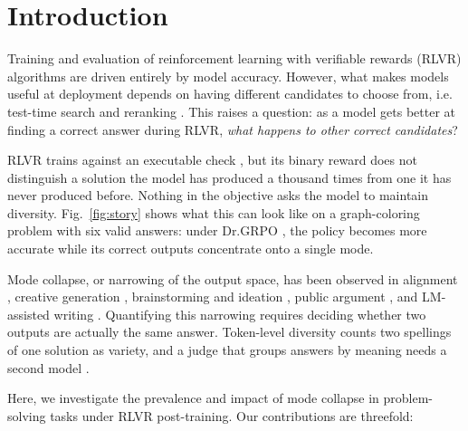 \documentclass{article}
\newcommand{\1}{\mathbf 1}
\theoremstyle{remark}
\theoremstyle{definition}
\theoremstyle{plain}
\begin{document}
\section{Introduction}
\label{sec:introduction}

Training and evaluation of reinforcement learning with verifiable rewards (RLVR) algorithms are driven entirely by model accuracy.
However, what makes models useful at deployment depends on having different candidates to choose from, i.e. test-time search and reranking \citep{brown2024monkeys,snell2024testtime,cobbe2021training,wang2023selfconsistency}. This raises a question: as a model gets better at finding a correct answer during RLVR, \textit{what happens to other correct candidates}?

RLVR trains against an executable check \citep{guo2025deepseekr1}, but its binary reward does not distinguish a solution the model has produced a thousand times from one it has never produced before.
Nothing in the objective asks the model to maintain diversity.
Fig.~\ref{fig:story} shows what this can look like on a graph-coloring problem with six valid answers: under Dr.GRPO \citep{liu2025understanding}, the policy becomes more accurate while its correct outputs concentrate onto a single mode.

Mode collapse, or narrowing of the output space, has been observed in alignment \citep{kirk2024understanding,cui2025entropy}, creative generation \citep{doshi2024creative}, brainstorming and ideation \citep{anderson2024homogenization}, public argument \citep{kim2026argument}, and LM-assisted writing \citep{abdulhai2026distort}.
Quantifying this narrowing requires deciding whether two outputs are actually the same answer.
Token-level diversity \citep{li2016diversity,zhu2018texygen} counts two spellings of one solution as variety, and a judge that groups answers by meaning needs a second model \citep{farquhar2024detecting,zheng2023judging}.

Here, we investigate the prevalence and impact of mode collapse in problem-solving tasks under RLVR post-training. Our contributions are threefold:
\end{document}
